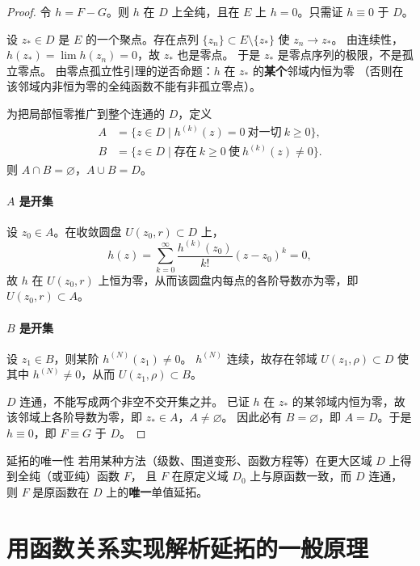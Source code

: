 \begin{proof}
令 $h=F-G$。则 $h$ 在 $D$ 上全纯，且在 $E$ 上 $h=0$。只需证 $h\equiv 0$ 于 $D$。

设 $z_*\in D$ 是 $E$ 的一个聚点。存在点列 $\{z_n\}\subset E\setminus\{z_*\}$ 使 $z_n\to z_*$。
由连续性，$h(z_*)=\lim h(z_n)=0$，故 $z_*$ 也是零点。
于是 $z_*$ 是零点序列的极限，不是孤立零点。
由零点孤立性引理的逆否命题：$h$ 在 $z_*$ 的\textbf{某个}邻域内恒为零
（否则在该邻域内非恒为零的全纯函数不能有非孤立零点）。

为把局部恒零推广到整个连通的 $D$，定义
\begin{align*}
A &= \{ z\in D \mid h^{(k)}(z)=0\ \text{对一切}\ k\ge 0 \},\\
B &= \{ z\in D \mid \text{存在}\ k\ge 0\ \text{使}\ h^{(k)}(z)\neq 0 \}.
\end{align*}
则 $A\cap B=\varnothing$，$A\cup B=D$。

\paragraph{$A$ 是开集}
设 $z_0\in A$。在收敛圆盘 $U(z_0,r)\subset D$ 上，
\[
h(z)=\sum_{k=0}^\infty\frac{h^{(k)}(z_0)}{k!}(z-z_0)^k=0,
\]
故 $h$ 在 $U(z_0,r)$ 上恒为零，从而该圆盘内每点的各阶导数亦为零，即 $U(z_0,r)\subset A$。

\paragraph{$B$ 是开集}
设 $z_1\in B$，则某阶 $h^{(N)}(z_1)\neq 0$。
$h^{(N)}$ 连续，故存在邻域 $U(z_1,\rho)\subset D$ 使其中 $h^{(N)}\neq 0$，从而 $U(z_1,\rho)\subset B$。

$D$ 连通，不能写成两个非空不交开集之并。
已证 $h$ 在 $z_*$ 的某邻域内恒为零，故该邻域上各阶导数为零，即 $z_*\in A$，$A\neq\varnothing$。
因此必有 $B=\varnothing$，即 $A=D$。于是 $h\equiv 0$，即 $F\equiv G$ 于 $D$。
\end{proof}

\begin{corollary}{延拓的唯一性}{}
若用某种方法（级数、围道变形、函数方程等）在更大区域 $D$ 上得到全纯（或亚纯）函数 $F$，
且 $F$ 在原定义域 $D_0$ 上与原函数一致，而 $D$ 连通，
则 $F$ 是原函数在 $D$ 上的\textbf{唯一}单值延拓。
\end{corollary}


\section{用函数关系实现解析延拓的一般原理}\label{sec:fe_continuation_schema}

